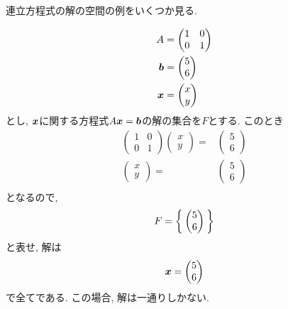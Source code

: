 連立方程式の解の空間の例をいくつか見る.
\begin{example}
  \begin{align*}
    A&=\begin{pmatrix}1&0\\0&1\end{pmatrix}\\
    \boldsymbol{b}&=\begin{pmatrix}5\\6\end{pmatrix}\\
    \boldsymbol{x}&=\begin{pmatrix}x\\y\end{pmatrix}
  \end{align*}
  とし,
  $\boldsymbol{x}$に関する方程式$A\boldsymbol{x}=\boldsymbol{b}$の解の集合を$F$とする.
  このとき
  \begin{align*}
    \begin{pmatrix}1&0\\0&1\end{pmatrix}
      \begin{pmatrix}x\\y\end{pmatrix}=&
        \begin{pmatrix}5\\6\end{pmatrix}\\
          \begin{pmatrix}x\\y\end{pmatrix}=&
            \begin{pmatrix}5\\6\end{pmatrix}\\
  \end{align*}
  となるので,
  \begin{align*}
    F=\Set{\begin{pmatrix}5\\6\end{pmatrix}}
  \end{align*}
  と表せ, 解は
  \begin{align*}
    \boldsymbol{x}=\begin{pmatrix}5\\6\end{pmatrix}\\
  \end{align*}
  で全てである.
  この場合, 解は一通りしかない.
\end{example}

